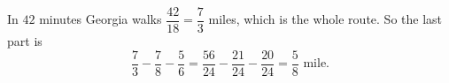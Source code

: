 In $42$ minutes Georgia walks $\dfrac{42}{18}=\dfrac73$ miles, which is the whole route. So the last part is
\[\dfrac73-\dfrac78-\dfrac56=\dfrac{56}{24}-\dfrac{21}{24}-\dfrac{20}{24}=\boxed{\dfrac58}\text{ mile}.\]
